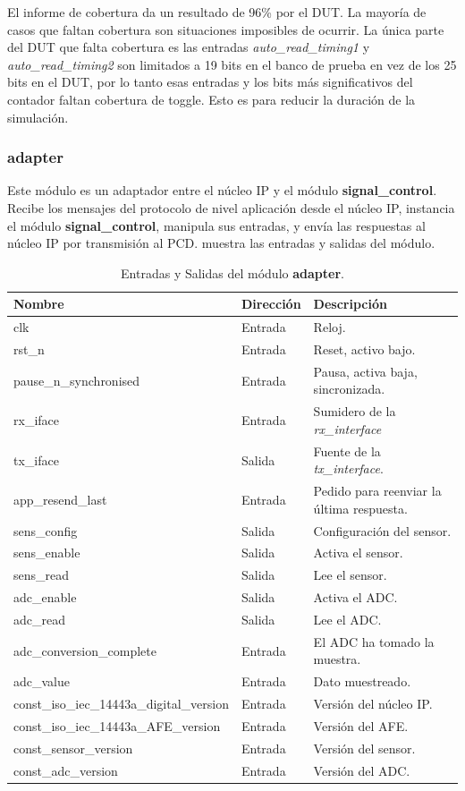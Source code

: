 \documentclass[a4paper, twoside, 11pt]{report}
\begin{document}
El informe de cobertura da un resultado de 96\% por el DUT. La mayoría de casos que faltan cobertura son situaciones imposibles de ocurrir. La única parte del DUT que falta cobertura es las entradas \textit{auto\_read\_timing1} y \textit{auto\_read\_timing2} son limitados a 19 bits en el banco de prueba en vez de los 25 bits en el DUT, por lo tanto esas entradas y los bits más significativos del contador faltan cobertura de toggle. Esto es para reducir la duración de la simulación.

\FloatBarrier
\subsubsection{adapter}

Este módulo es un adaptador entre el núcleo IP y el módulo \textbf{signal\_control}. Recibe los mensajes del protocolo de nivel aplicación desde el núcleo IP, instancia el módulo \textbf{signal\_control}, manipula sus entradas, y envía las respuestas al núcleo IP por transmisión al PCD.  muestra las entradas y salidas del módulo.

\begin{table}[htb]
  \centering
  \tablezebra
  \begin{tabulary}{\linewidth}{l|l|L}
    \setcounter{rownum}{0}
    \textbf{Nombre}&\textbf{Dirección}&\textbf{Descripción} \\
    \hline
    clk&Entrada&Reloj. \\
    rst\_n&Entrada&Reset, activo bajo. \\
    pause\_n\_synchronised&Entrada&Pausa, activa baja, sincronizada. \\
    rx\_iface&Entrada&Sumidero de la \textit{rx\_interface} \\
    tx\_iface&Salida&Fuente de la \textit{tx\_interface}. \\
    app\_resend\_last&Entrada&Pedido para reenviar la última respuesta. \\
    sens\_config&Salida&Configuración del sensor. \\
    sens\_enable&Salida&Activa el sensor. \\
    sens\_read&Salida&Lee el sensor. \\
    adc\_enable&Salida&Activa el ADC. \\
    adc\_read&Salida&Lee el ADC. \\
    adc\_conversion\_complete&Entrada&El ADC ha tomado la muestra. \\
    adc\_value&Entrada&Dato muestreado. \\
    const\_iso\_iec\_14443a\_digital\_version&Entrada&Versión del núcleo IP. \\
    const\_iso\_iec\_14443a\_AFE\_version&Entrada&Versión del AFE. \\
    const\_sensor\_version&Entrada&Versión del sensor. \\
    const\_adc\_version&Entrada&Versión del ADC. \\
  \end{tabulary}
  \caption{Entradas y Salidas del módulo \textbf{adapter}.}
  \label{tab:ports_adapter}
\end{table}
\end{document}
